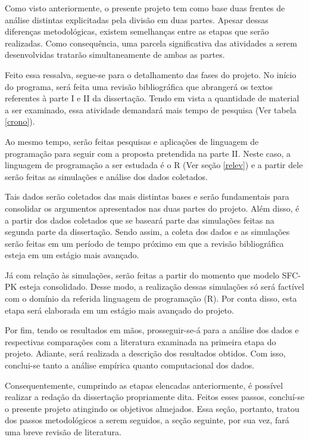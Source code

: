 \documentclass[12pt]{report}
\begin{document}
Como visto anteriormente, o presente projeto tem como base duas frentes de análise distintas explicitadas pela divisão em duas partes. Apesar dessas diferenças metodológicas, existem semelhanças entre as etapas que serão realizadas. Como consequência, uma parcela significativa das atividades a serem desenvolvidas tratarão simultaneamente de ambas as partes.

Feito essa ressalva, segue-se para o detalhamento das fases do projeto. No início do programa, será feita uma revisão bibliográfica que abrangerá os textos referentes à parte I e II da dissertação. 
Tendo em vista a quantidade de material a ser examinado, essa atividade demandará mais tempo de pesquisa (Ver tabela \ref{crono}).

Ao mesmo tempo, serão feitas pesquisas e aplicações de linguagem de programação para seguir com a proposta pretendida na parte II. Neste caso, a linguagem de programação a ser estudada é o R (Ver seção \ref{relev}) e a partir dele serão feitas as simulações e análise dos dados coletados.


Tais dados serão coletados das mais distintas bases e serão fundamentais para consolidar os argumentos apresentados nas duas partes do projeto. Além disso, é a partir dos dados coletados que se baseará parte das simulações feitas na segunda parte da dissertação. Sendo assim, a coleta dos dados e as simulações serão feitas em um período de tempo próximo em que a revisão bibliográfica esteja em um estágio mais avançado.

Já com relação às simulações, serão feitas a partir do momento que modelo SFC-PK esteja consolidado. Desse modo, a realização dessas simulações só será factível com o domínio da referida linguagem de programação (R). Por conta disso, esta etapa será elaborada em um estágio mais avançado do projeto.

Por fim, tendo os resultados em mãos, prosseguir-se-á para a análise dos dados e respectivas comparações com a literatura examinada na primeira etapa do projeto. Adiante, será realizada a descrição dos resultados obtidos. Com isso, conclui-se tanto a análise empírica quanto computacional dos dados.

Consequentemente, cumprindo as etapas elencadas anteriormente,  é possível realizar a redação da dissertação propriamente dita. Feitos esses passos, concluí-se o presente projeto atingindo os objetivos almejados. Essa seção, portanto, tratou dos passos metodológicos a serem seguidos, a seção seguinte, por sua vez, fará uma breve revisão de literatura.
\end{document}
